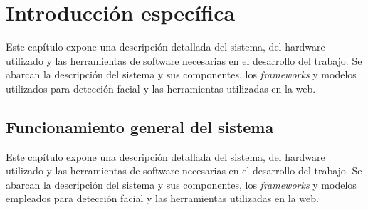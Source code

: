 \chapter{Introducción específica} %

\label{Chapter2} %

Este capítulo expone una descripción detallada del sistema, del hardware utilizado y las herramientas de  software necesarias en el desarrollo del trabajo. Se abarcan la descripción del sistema y sus componentes, los \textit{frameworks} y modelos utilizados para detección facial y las herramientas utilizadas en la web.

\section{Funcionamiento general del sistema}
Este capítulo expone una descripción detallada del sistema, del hardware utilizado y las herramientas de software necesarias en el desarrollo del trabajo. Se abarcan la descripción del sistema y sus componentes, los \textit{frameworks} y modelos empleados para detección facial y las herramientas utilizadas en la web.

